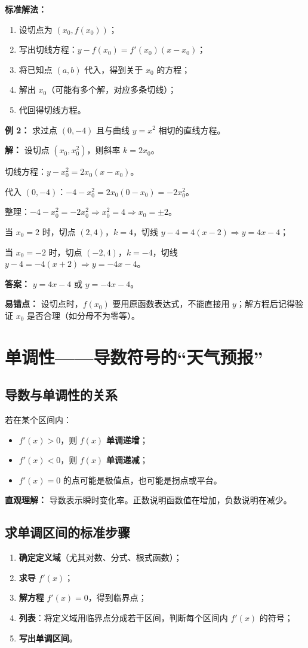 \documentclass[10pt]{article}
\begin{document}
\textbf{标准解法：}
\begin{enumerate}
    \item 设切点为 $(x_0, f(x_0))$；
    \item 写出切线方程：$y - f(x_0) = f'(x_0)(x - x_0)$；
    \item 将已知点 $(a,b)$ 代入，得到关于 $x_0$ 的方程；
    \item 解出 $x_0$（可能有多个解，对应多条切线）；
    \item 代回得切线方程。
\end{enumerate}

\textbf{例 2：} 求过点 $(0, -4)$ 且与曲线 $y = x^2$ 相切的直线方程。

\textbf{解：} 设切点 $(x_0, x_0^2)$，则斜率 $k = 2x_0$。

切线方程：$y - x_0^2 = 2x_0 (x - x_0)$。

代入 $(0, -4)$：$-4 - x_0^2 = 2x_0 (0 - x_0) = -2x_0^2$。

整理：$-4 - x_0^2 = -2x_0^2 \Rightarrow x_0^2 = 4 \Rightarrow x_0 = \pm 2$。

当 $x_0 = 2$ 时，切点 $(2,4)$，$k=4$，切线 $y-4=4(x-2) \Rightarrow y=4x-4$；

当 $x_0 = -2$ 时，切点 $(-2,4)$，$k=-4$，切线 $y-4=-4(x+2) \Rightarrow y=-4x-4$。

\textbf{答案：} $y=4x-4$ 或 $y=-4x-4$。

\textbf{易错点：} 设切点时，$f(x_0)$ 要用原函数表达式，不能直接用 $y$；解方程后记得验证 $x_0$ 是否合理（如分母不为零等）。

\section{单调性——导数符号的“天气预报”}
\subsection{导数与单调性的关系}
若在某个区间内：
\begin{itemize}
    \item $f'(x) > 0$，则 $f(x)$ \textbf{单调递增}；
    \item $f'(x) < 0$，则 $f(x)$ \textbf{单调递减}；
    \item $f'(x) = 0$ 的点可能是极值点，也可能是拐点或平台。
\end{itemize}
\textbf{直观理解：} 导数表示瞬时变化率。正数说明函数值在增加，负数说明在减少。

\subsection{求单调区间的标准步骤}
\begin{enumerate}
    \item \textbf{确定定义域}（尤其对数、分式、根式函数）；
    \item \textbf{求导} $f'(x)$；
    \item \textbf{解方程} $f'(x) = 0$，得到临界点；
    \item \textbf{列表}：将定义域用临界点分成若干区间，判断每个区间内 $f'(x)$ 的符号；
    \item \textbf{写出单调区间}。
\end{enumerate}
\end{document}
